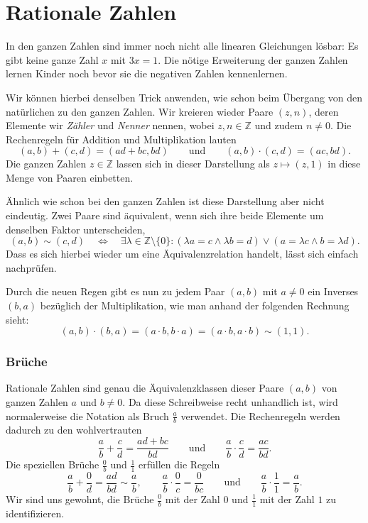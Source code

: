 %
%
%
\section{Rationale Zahlen
\label{buch:section:rationale-zahlen}}
In den ganzen Zahlen sind immer noch nicht alle linearen Gleichungen
lösbar: Es gibt keine ganze Zahl $x$ mit $3x=1$.
Die nötige Erweiterung der ganzen Zahlen lernen Kinder noch bevor sie
die negativen Zahlen kennenlernen.

Wir können hierbei denselben Trick anwenden,
wie schon beim Übergang von den natürlichen zu den ganzen Zahlen.
Wir kreieren wieder Paare $(z, n)$, deren Elemente wir \emph{Zähler} und
\emph{Nenner} nennen, wobei $z, n \in \mathbb Z$ und zudem $n \ne 0$.
Die Rechenregeln für Addition und Multiplikation lauten
\[
(a, b) + (c, d)
=
(ad + bc, bd)
\qquad \text{und} \qquad
(a, b) \cdot (c, d)
=
(ac, bd)
.
\]
Die ganzen Zahlen $z\in\mathbb{Z}$ lassen sich in dieser Darstellung als
$z \mapsto (z, 1)$ in diese Menge von Paaren einbetten.

Ähnlich wie schon bei den ganzen Zahlen ist diese Darstellung
aber nicht eindeutig.
Zwei Paare sind äquivalent, wenn sich ihre beide Elemente um denselben
Faktor unterscheiden,
\[
(a, b)
\sim
(c, d)
\quad \Leftrightarrow \quad
\exists \lambda \in \mathbb Z\setminus\{0\} \colon
(
\lambda a = c
\wedge
\lambda b = d
)
\vee
(
a = \lambda c
\wedge
b = \lambda d
)
.
\]
Dass es sich hierbei wieder um eine Äquivalenzrelation handelt, lässt sich
einfach nachprüfen.

Durch die neuen Regen gibt es nun zu jedem Paar $(a, b)$ mit $a \ne 0$
ein Inverses $(b, a)$ bezüglich der Multiplikation,
wie man anhand der folgenden Rechnung sieht:
\[
(a, b) \cdot (b, a)
=
(a \cdot b, b \cdot a)
=
(a \cdot b, a \cdot b)
\sim
(1, 1)
.
\]

\subsubsection{Brüche}
Rationale Zahlen sind genau die Äquivalenzklassen dieser Paare $(a, b)$ von
ganzen Zahlen $a$ und $b\ne 0$.
Da diese Schreibweise recht unhandlich ist, wird normalerweise die Notation
als Bruch $\frac{a}{b}$ verwendet.
%
Die Rechenregeln werden dadurch zu den wohlvertrauten
\[
\frac{a}{b}+\frac{c}{d}
=
\frac{ad+bc}{bd}
\qquad\text{und}\qquad
\frac{a}{b}\cdot\frac{c}{d}
=
\frac{ac}{bd}.
\]
Die speziellen Brüche $\frac{0}{b}$ und $\frac{1}{1}$ erfüllen die
Regeln
\[
\frac{a}{b}+\frac{0}{d} = \frac{ad}{bd} \sim \frac{a}{b},
\qquad
\frac{a}{b}\cdot \frac{0}{c} = \frac{0}{bc}
\qquad\text{und}\qquad
\frac{a}{b}\cdot \frac{1}{1} = \frac{a}{b}.
\]
Wir sind uns gewohnt, die Brüche $\frac{0}{b}$ mit der Zahl $0$ und
$\frac{1}{1}$ mit der Zahl $1$ zu identifizieren.

